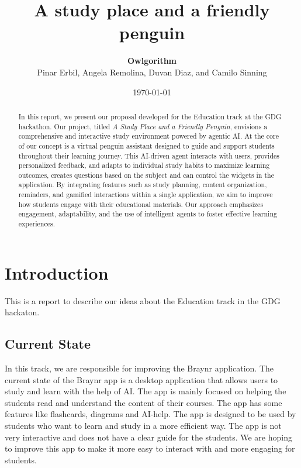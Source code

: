 \documentclass{report}
\title{A study place and a friendly penguin}
\author{\textbf{Owlgorithm} \\ Pinar Erbil, Angela Remolina, Duvan Diaz, and Camilo Sinning}
\date{\today}
\begin{document}
\maketitle

\newpage

\begin{abstract}
In this report, we present our proposal developed for the Education track at the GDG hackathon. Our project, titled \textit{A Study Place and a Friendly Penguin}, envisions a comprehensive and interactive study environment powered by agentic AI. At the core of our concept is a virtual penguin assistant designed to guide and support students throughout their learning journey. This AI-driven agent interacts with users, provides personalized feedback, and adapts to individual study habits to maximize learning outcomes, creates questions based on the subject and can control the widgets in the application. By integrating features such as study planning, content organization, reminders, and gamified interactions within a single application, we aim to improve how students engage with their educational materials. Our approach emphasizes engagement, adaptability, and the use of intelligent agents to foster effective learning experiences.
\end{abstract}

\chapter{Introduction}

This is a report to describe our ideas about the Education track in the GDG hackaton.

\section{Current State}

In this track, we are responsible for improving the Braynr application. The current state of the Braynr app is a desktop application that allows users to study and learn with the help of AI. The app is mainly focused on helping the students read and understand the content of their courses. The app has some features like flashcards, diagrams and AI-help. The app is designed to be used by students who want to learn and study in a more efficient way. The app is not very interactive and does not have a clear guide for the students. We are hoping to improve this app to make it more easy to interact with and more engaging for students.
\end{document}
